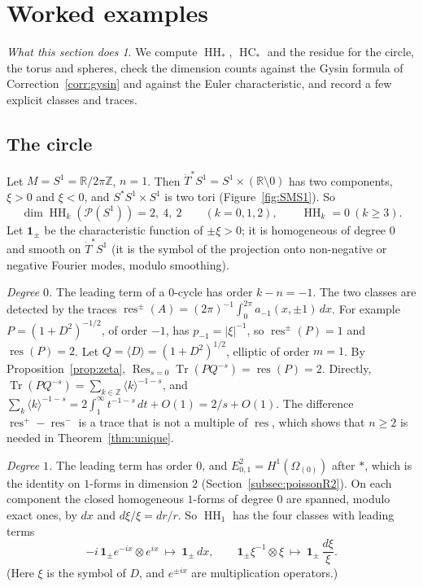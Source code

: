 \documentclass[11pt,oneside,reqno]{article}
\DeclareMathOperator{\HH}{HH}
\DeclareMathOperator{\HC}{HC}
\DeclareMathOperator{\Tr}{Tr}
\DeclareMathOperator{\res}{res}
\DeclareMathOperator{\Res}{Res}
\newcommand{\R}{\mathbb R}
\newcommand{\Z}{\mathbb Z}
\newcommand{\cP}{\mathcal P}
\newcommand{\Om}{\Omega}
\newcommand{\Tdot}{\dot T^*}
\theoremstyle{plain}
\theoremstyle{definition}
\theoremstyle{remark}
\newtheorem*{whatdoes}{What this section does}
\begin{document}
\section{Worked examples}\label{sec:examples}

\begin{whatdoes}
We compute \(\HH_*\), \(\HC_*\) and the residue for the circle, the torus and spheres,
check the dimension counts against the Gysin formula of
Correction~\ref{corr:gysin} and against the Euler characteristic, and record a few
explicit classes and traces.
\end{whatdoes}

\subsection{The circle}\label{subsec:exS1}
Let \(M=S^1=\R/2\pi\Z\), \(n=1\). Then \(\Tdot S^1=S^1\times(\R\setminus0)\) has two components, \(\xi>0\)
and \(\xi<0\), and \(S^*S^1\times S^1\) is two tori (Figure~\ref{fig:SMS1}). So
\[
 \dim\HH_k(\cP(S^1))=2,\ 4,\ 2\qquad(k=0,1,2),\qquad \HH_k=0\ (k\ge3).
\]
Let \(\mathbf 1_\pm\) be the characteristic function of \(\pm\xi>0\); it is homogeneous of degree \(0\) and
smooth on \(\Tdot S^1\) (it is the symbol of the projection onto non-negative or
negative Fourier modes, modulo smoothing).

\emph{Degree \(0\).} The leading term of a \(0\)-cycle has order \(k-n=-1\). The two classes are
detected by the traces \(\res^\pm(A)=(2\pi)^{-1}\int_0^{2\pi}a_{-1}(x,\pm1)\,dx\). For example
\(P=(1+D^2)^{-1/2}\), of order \(-1\), has \(p_{-1}=|\xi|^{-1}\), so \(\res^\pm(P)=1\) and \(\res(P)=2\). Let
\(Q=\langle D\rangle=(1+D^2)^{1/2}\), elliptic of order \(m=1\). By Proposition~\ref{prop:zeta},
\(\Res_{s=0}\Tr(PQ^{-s})=\res(P)=2\). Directly, \(\Tr(PQ^{-s})=\sum_{k\in\Z}\langle k\rangle^{-1-s}\), and
\(\sum_{k}\langle k\rangle^{-1-s}=2\int_1^\infty t^{-1-s}\,dt+O(1)=2/s+O(1)\). The difference \(\res^+-\res^-\) is a
trace that is not a multiple of \(\res\), which shows that \(n\ge2\) is needed in
Theorem~\ref{thm:unique}.

\emph{Degree \(1\).} The leading term has order \(0\), and \(E^2_{0,1}=H^1(\Om_{(0)})\) after \(*\), which is the
identity on \(1\)-forms in dimension \(2\) (Section~\ref{subsec:poissonR2}). On each component
the closed homogeneous \(1\)-forms of degree \(0\) are spanned, modulo exact ones, by \(dx\) and
\(d\xi/\xi=dr/r\). So \(\HH_1\) has the four classes with leading terms
\[
 -i\,\mathbf 1_\pm e^{-ix}\otimes e^{ix}\ \mapsto\ \mathbf 1_\pm\,dx,\qquad
 \mathbf 1_\pm\xi^{-1}\otimes\xi\ \mapsto\ \mathbf 1_\pm\,\frac{d\xi}\xi .
\]
(Here \(\xi\) is the symbol of \(D\), and \(e^{\pm ix}\) are multiplication operators.)
\end{document}
